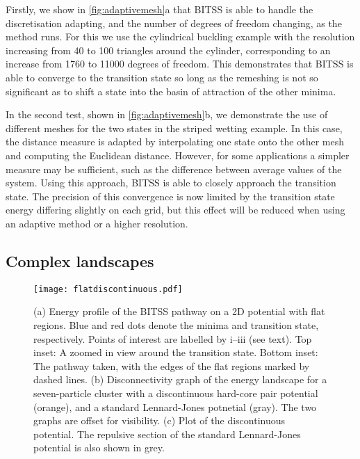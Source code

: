 \documentclass[twocolumn,10pt]{revtex4}
\begin{document}
Firstly, we show in \cref{fig:adaptivemesh}a that BITSS is able to handle the discretisation adapting, and the number of degrees of freedom changing, as the method runs.
For this we use the cylindrical buckling example with the resolution increasing from 40 to 100 triangles around the cylinder, corresponding to an increase from \num{1760} to \num{11000} degrees of freedom.
This demonstrates that BITSS is able to converge to the transition state so long as the remeshing is not so significant as to shift a state into the basin of attraction of the other minima.

In the second test, shown in \cref{fig:adaptivemesh}b, we demonstrate the use of different meshes for the two states in the striped wetting example.
In this case, the distance measure is adapted by interpolating one state onto the other mesh and computing the Euclidean distance.
However, for some applications a simpler measure may be sufficient, such as the difference between average values of the system.
Using this approach, BITSS is able to closely approach the transition state.
The precision of this convergence is now limited by the transition state energy differing slightly on each grid, but this effect will be reduced when using an adaptive method or a higher resolution.


\subsection{Complex landscapes}
\begin{figure}[tb]
  \texttt{[image: flatdiscontinuous.pdf]}
  \caption{\label{fig:flatdiscontinuous}
    (a) Energy profile of the BITSS pathway on a 2D potential with flat regions.
        Blue and red dots denote the minima and transition state, respectively.
        Points of interest are labelled by i--iii (see text).
        Top inset: A zoomed in view around the transition state.
        Bottom inset: The pathway taken, with the edges of the flat regions marked by dashed lines.
    (b) Disconnectivity graph of the energy landscape for a seven-particle cluster with a discontinuous hard-core pair potential (orange), and a standard Lennard-Jones potnetial (gray).
        The two graphs are offset for visibility.
    (c) Plot of the discontinuous potential.
        The repulsive section of the standard Lennard-Jones potential is also shown in grey.
  }
\end{figure}
\end{document}
